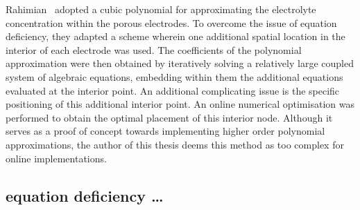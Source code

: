 Rahimian~\etal{} adopted  a cubic  polynomial for approximating  the electrolyte
concentration within  the porous electrodes.  To overcome the issue  of equation
deficiency, they adapted a scheme wherein one additional spatial location in the
interior  of  each  electrode  was  used. The  coefficients  of  the  polynomial
approximation  were then  obtained  by iteratively  solving  a relatively  large
coupled  system of  algebraic equations,  embedding within  them the  additional
equations evaluated at  the interior point. An additional  complicating issue is
the specific positioning of this  additional interior point. An online numerical
optimisation  was performed  to obtain  the optimal  placement of  this interior
node. Although it serves as a proof of concept towards implementing higher order
polynomial approximations,  the author of this  thesis deems this method  as too
complex for online implementations.




\subsection{equation deficiency \dots}\label{temp:eqndeficiency}










